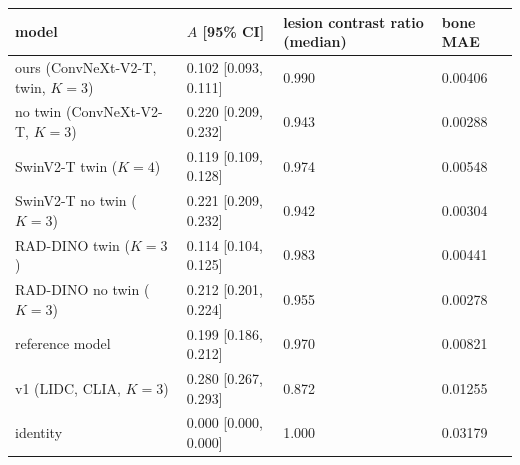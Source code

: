 \begin{tabular}{llll}
\toprule
model & $A$ [95\% CI] & lesion contrast ratio (median) & bone MAE \\
\midrule
ours (ConvNeXt-V2-T, twin, $K=3$) & 0.102 [0.093, 0.111] & 0.990 & 0.00406 \\
no twin (ConvNeXt-V2-T, $K=3$) & 0.220 [0.209, 0.232] & 0.943 & 0.00288 \\
SwinV2-T twin ($K=4$) & 0.119 [0.109, 0.128] & 0.974 & 0.00548 \\
SwinV2-T no twin ($K=3$) & 0.221 [0.209, 0.232] & 0.942 & 0.00304 \\
RAD-DINO twin ($K=3$) & 0.114 [0.104, 0.125] & 0.983 & 0.00441 \\
RAD-DINO no twin ($K=3$) & 0.212 [0.201, 0.224] & 0.955 & 0.00278 \\
reference model & 0.199 [0.186, 0.212] & 0.970 & 0.00821 \\
v1 (LIDC, CLIA, $K=3$) & 0.280 [0.267, 0.293] & 0.872 & 0.01255 \\
identity & 0.000 [0.000, 0.000] & 1.000 & 0.03179 \\
\bottomrule
\end{tabular}
